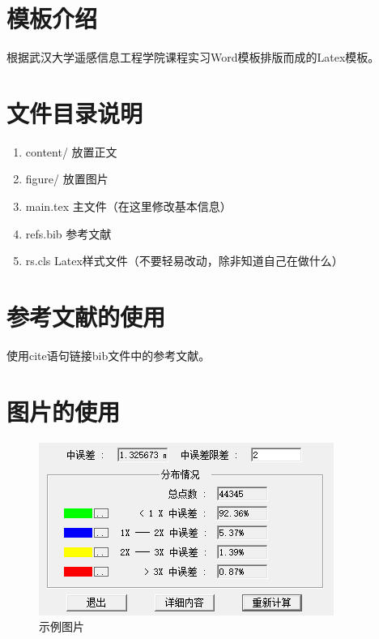 \section{模板介绍}

根据武汉大学遥感信息工程学院课程实习Word模板排版而成的Latex模板。

\section{文件目录说明}

\begin{enumerate}[itemsep=2pt,topsep=0pt,parsep=0pt]
    \item content/ 放置正文
    \item figure/ 放置图片
    \item main.tex 主文件（在这里修改基本信息）
    \item refs.bib 参考文献
    \item rs.cls Latex样式文件（不要轻易改动，除非知道自己在做什么）
\end{enumerate}

\section{参考文献的使用}

使用cite语句链接bib文件中的参考文献。\cite{CMJH200711001007}

\section{图片的使用}

\begin{figure}[H]%
    \centering
    \begin{minipage}{0.83\textwidth}%
        \centering
        \includegraphics[width=1.0%
        \textwidth]{figure/DEM拼接精度.png}%
        \caption{\fontsize{10pt}{15pt}\selectfont 示例图片}
    \end{minipage}
\end{figure}

